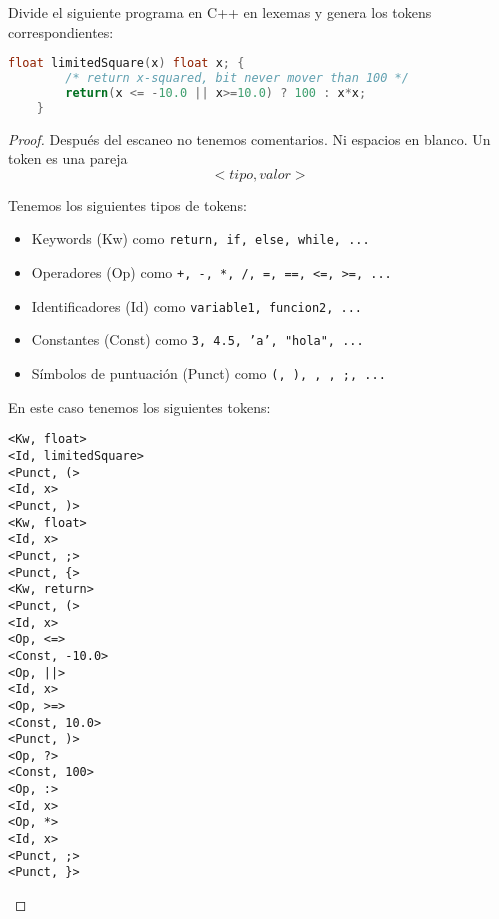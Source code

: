 \begin{Pro}
Divide el siguiente programa en C++ en lexemas y genera los tokens correspondientes:
\end{Pro}
\begin{lstlisting}[language=C++]
    float limitedSquare(x) float x; {
        /* return x-squared, bit never mover than 100 */
        return(x <= -10.0 || x>=10.0) ? 100 : x*x;
    }
\end{lstlisting}

\begin{proof}
    \hspace{5mm}

Después del escaneo no tenemos comentarios. Ni espacios en blanco. 
Un token es una pareja $$<tipo, valor>$$

Tenemos los siguientes tipos de tokens:
\begin{itemize}
    \item Keywords (Kw) como \texttt{return, if, else, while, ...}
    \item Operadores (Op) como \texttt{+, -, *, /, =, ==, <=, >=, ...}
    \item Identificadores (Id) como \texttt{variable1, funcion2, ...}
    \item Constantes (Const) como \texttt{3, 4.5, 'a', "hola", ...}
    \item Símbolos de puntuación (Punct) como \texttt{(, ), {, }, ;, ...}
\end{itemize}

En este caso tenemos los siguientes tokens:
\begin{lstlisting}
<Kw, float> 
<Id, limitedSquare>
<Punct, (>
<Id, x>
<Punct, )>
<Kw, float>
<Id, x>
<Punct, ;>
<Punct, {>
<Kw, return>
<Punct, (>
<Id, x>
<Op, <=>
<Const, -10.0>
<Op, ||>
<Id, x>
<Op, >=>
<Const, 10.0>
<Punct, )>
<Op, ?>
<Const, 100>
<Op, :>
<Id, x>
<Op, *>
<Id, x>
<Punct, ;>
<Punct, }>
\end{lstlisting}
\end{proof}
